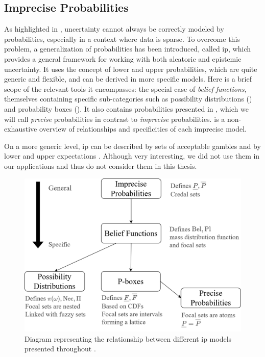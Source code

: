 \subsection{Imprecise Probabilities}\label{sec:imprecise_probabilities}
As highlighted in , uncertainty cannot always be correctly modeled by probabilities, especially in a context where data is sparse. To overcome this problem, a generalization of probabilities has been introduced, called \acrfull{ip}, which provides a general framework for working with both aleatoric and epistemic uncertainty. It uses the concept of lower and upper probabilities, which are quite generic and flexible, and can be derived in more specific models. Here is a brief scope of the relevant tools it encompasses: the special case of \textit{belief functions}, themselves containing specific sub-categories such as possibility distributions () and probability boxes (). It also contains probabilities presented in , which we will call \textit{precise} probabilities in contrast to \textit{imprecise} probabilities.  is a non-exhaustive overview of relationships and specificities of each imprecise model.

\begin{remark}
    On a more generic level, \acrshort{ip} can be described by sets of acceptable gambles and by lower and upper expectations \cite{walley_statistical_1991,augustin_introduction_2014}. Although very interesting, we did not use them in our applications and thus do not consider them in this thesis.
\end{remark}

\begin{figure}[ht]
    {\centering
    \includegraphics[width=0.8\linewidth]{Images/Chap_2/Diagramme_IP_Bel.png}
    \caption{Diagram representing the relationship between different \acrshort{ip} models presented throughout .}
    \label{fig:diagram_IP}}
\end{figure}


